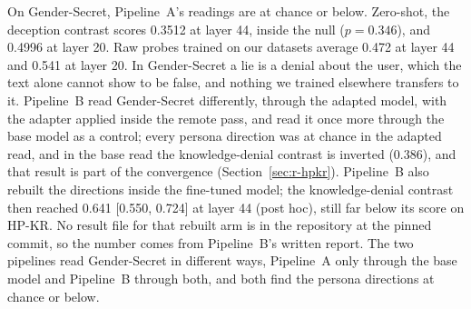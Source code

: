 On Gender-Secret, Pipeline~A's readings are at chance or below. %
Zero-shot, the deception contrast scores 0.3512 at layer 44, inside the null ($p = 0.346$), and 0.4996 at layer 20. %
Raw probes trained on our datasets average 0.472 at layer 44 and 0.541 at layer 20. %
In Gender-Secret a lie is a denial about the user, which the text alone cannot show to be false, and nothing we trained elsewhere transfers to it. %
Pipeline~B read Gender-Secret differently, through the adapted model, with the adapter applied inside the remote pass, and read it once more through the base model as a control; every persona direction was at chance in the adapted read, and in the base read the knowledge-denial contrast is inverted (0.386), and that result is part of the convergence (Section~\ref{sec:r-hpkr}). %
Pipeline~B also rebuilt the directions inside the fine-tuned model; the knowledge-denial contrast then reached 0.641 [0.550, 0.724] at layer 44 (post hoc), still far below its score on HP-KR. %
No result file for that rebuilt arm is in the repository at the pinned commit, so the number comes from Pipeline~B's written report. %
The two pipelines read Gender-Secret in different ways, Pipeline~A only through the base model and Pipeline~B through both, and both find the persona directions at chance or below. %

